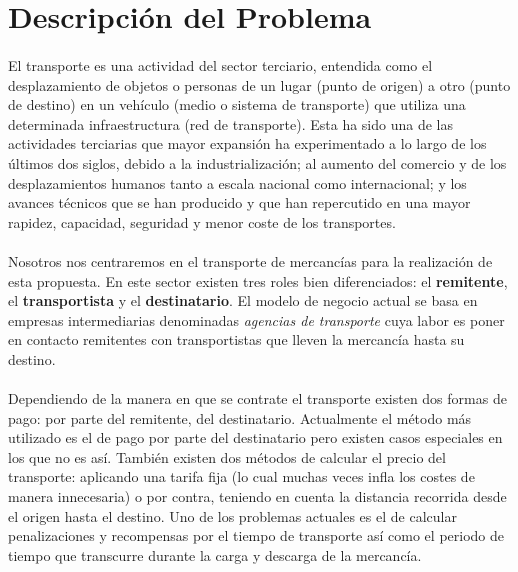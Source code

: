 \documentclass[10pt, a4paper,spanish]{article}
\begin{document}
	\section{Descripción del Problema}

		\paragraph{}
		El transporte es una actividad del sector terciario, entendida como el desplazamiento de objetos o personas de un lugar (punto de origen) a otro (punto de destino) en un vehículo (medio o sistema de transporte) que utiliza una determinada infraestructura (red de transporte). Esta ha sido una de las actividades terciarias que mayor expansión ha experimentado a lo largo de los últimos dos siglos, debido a la industrialización; al aumento del comercio y de los desplazamientos humanos tanto a escala nacional como internacional; y los avances técnicos que se han producido y que han repercutido en una mayor rapidez, capacidad, seguridad y menor coste de los transportes. \cite{wikipedia_transporte}

		\paragraph{}
		Nosotros nos centraremos en el transporte de mercancías para la realización de esta propuesta. En este sector existen tres roles bien diferenciados: el \textbf{remitente}, el \textbf{transportista} y el \textbf{destinatario}. El modelo de negocio actual se basa en empresas intermediarias denominadas \textit{agencias de transporte} cuya labor es poner en contacto remitentes con transportistas que lleven la mercancía hasta su destino.

		\paragraph{}
		Dependiendo de la manera en que se contrate el transporte existen dos formas de pago: por parte del remitente, del destinatario. Actualmente el método más utilizado es el de pago por parte del destinatario pero existen casos especiales en los que no es así. También existen dos métodos de calcular el precio del transporte: aplicando una tarifa fija (lo cual muchas veces infla los costes de manera innecesaria) o por contra, teniendo en cuenta la distancia recorrida desde el origen hasta el destino. Uno de los problemas actuales es el de calcular penalizaciones y recompensas por el tiempo de transporte así como el periodo de tiempo que transcurre durante la carga y descarga de la mercancía.
\end{document}
